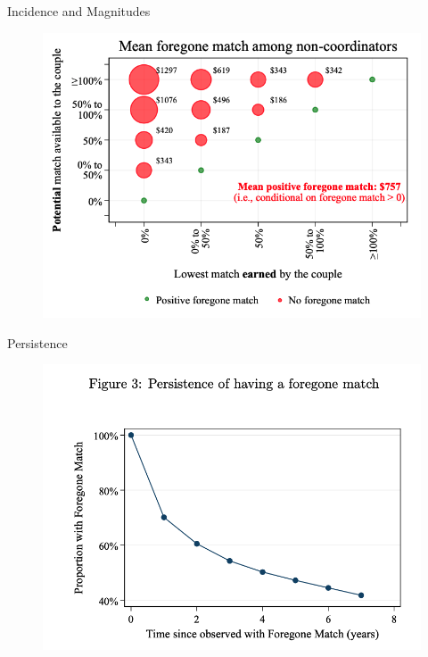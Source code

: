 \documentclass[11pt,notes=hide,aspectratio=169,mathserif]{beamer}
\begin{document}
\begin{frame}{Incidence and Magnitudes}
\small
\begin{figure}
\centering
\includegraphics[width=0.9\linewidth]{inputs/figure2b.png}
\end{figure}
\end{frame}

\begin{frame}{Persistence}
\small
\begin{figure}
\centering
\includegraphics[width=0.7\linewidth]{inputs/fig3.png}
\end{figure}
\end{frame}
\end{document}
